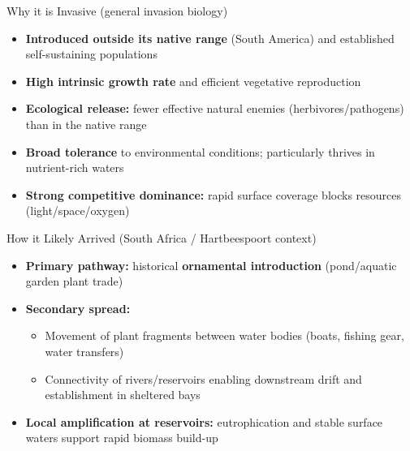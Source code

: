 \begin{frame}{Why it is Invasive (general invasion biology)}
\begin{itemize}
  \item \textbf{Introduced outside its native range} (South America) and established self-sustaining populations
  \item \textbf{High intrinsic growth rate} and efficient vegetative reproduction
  \item \textbf{Ecological release:} fewer effective natural enemies (herbivores/pathogens) than in the native range
  \item \textbf{Broad tolerance} to environmental conditions; particularly thrives in nutrient-rich waters
  \item \textbf{Strong competitive dominance:} rapid surface coverage blocks resources (light/space/oxygen)
\end{itemize}
\end{frame}

\begin{frame}{How it Likely Arrived (South Africa / Hartbeespoort context)}
\begin{itemize}
  \item \textbf{Primary pathway:} historical \textbf{ornamental introduction} (pond/aquatic garden plant trade)
  \item \textbf{Secondary spread:}
    \begin{itemize}
      \item Movement of plant fragments between water bodies (boats, fishing gear, water transfers)
      \item Connectivity of rivers/reservoirs enabling downstream drift and establishment in sheltered bays
    \end{itemize}
  \item \textbf{Local amplification at reservoirs:} eutrophication and stable surface waters support rapid biomass build-up
\end{itemize}
\end{frame}

